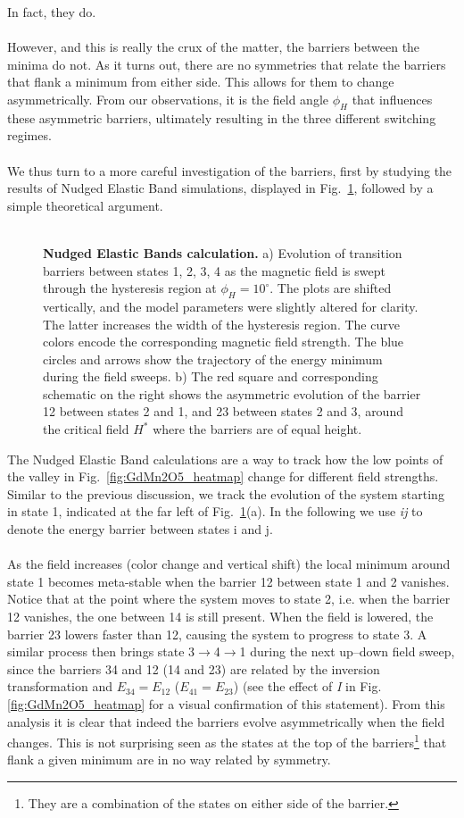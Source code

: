 In fact, they do.
\\\\
However, and this is really the crux of the matter, the barriers between the minima do not. As it turns out, there are no symmetries that relate the barriers that flank a minimum from either side.
This allows for them to change asymmetrically.
From our observations, it is the field angle $\phi_H$ that influences these asymmetric barriers, ultimately resulting in the three different switching regimes.
\\\\
We thus turn to a more careful investigation of the barriers, first by studying the results of Nudged Elastic Band simulations, displayed in Fig.~\ref{fig:GdMn2O5_neb}, followed by a simple theoretical argument.
\\\\
\begin{figure}[h]
    \caption{\label{fig:GdMn2O5_neb}{\bf Nudged Elastic Bands calculation.}
    a) Evolution of transition barriers between states 1, 2, 3, 4 as the magnetic field is swept through the hysteresis region at $\phi_H = 10^\circ$. The plots are shifted vertically, and the model parameters were slightly altered for clarity. The latter increases the width of the hysteresis region. The curve colors encode the corresponding magnetic field strength. The blue circles and arrows show the trajectory of the energy minimum during the field sweeps.
    b) The red square and corresponding schematic on the right shows the asymmetric evolution of the barrier 12 between states 2 and 1, and 23 between states 2 and 3, around the critical field $H^\ast$ where the barriers are of equal height.
    }
\end{figure}
%
The Nudged Elastic Band calculations are a way to track how the low points of the valley in Fig.~\ref{fig:GdMn2O5_heatmap} change for different field strengths.
Similar to the previous discussion, we track the evolution of the system starting in state 1, indicated at the far left of Fig.~\ref{fig:GdMn2O5_neb}(a).
In the following we use {\it ij} to denote the energy barrier between states i and j.
\\\\
As the field increases (color change and vertical shift) the local minimum around state 1 becomes meta-stable when the barrier 12 between state 1 and 2 vanishes.
Notice that at the point where the system moves to state 2, i.e. when the barrier 12 vanishes, the one between 14 is still present.
When the field is lowered, the barrier 23 lowers faster than 12, causing the system to progress to state 3.
A similar process then brings state 3$\rightarrow$4$\rightarrow$1 during the next up--down field sweep, since the barriers 34 and 12  (14 and 23) are related by the inversion transformation and  $E_{34} = E_{12}$ ($E_{41} = E_{23}$) (see the effect of {\it I} in Fig.\ref{fig:GdMn2O5_heatmap} for a visual confirmation of this statement).
From this analysis it is clear that indeed the barriers evolve asymmetrically when the field changes.
This is not surprising seen as the states at the top of the barriers\footnote{They are a combination of the states on either side of the barrier.} that flank a given minimum are in no way related by symmetry.

